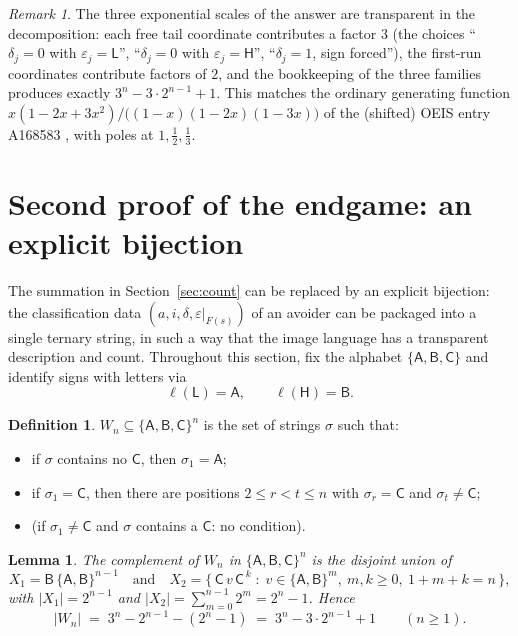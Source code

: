 \documentclass[11pt]{article}
\newtheorem{lemma}[theorem]{Lemma}
\theoremstyle{definition}
\newtheorem{definition}[theorem]{Definition}
\theoremstyle{remark}
\newtheorem{remark}[theorem]{Remark}
\newcommand{\sL}{\mathsf{L}}
\newcommand{\sH}{\mathsf{H}}
\newcommand{\sA}{\mathsf{A}}
\newcommand{\sB}{\mathsf{B}}
\newcommand{\sC}{\mathsf{C}}
\newcommand{\Wn}{W_n}
\begin{document}
\begin{remark}\label{rem:structure}
The three exponential scales of the answer are transparent in the
decomposition: each free tail coordinate contributes a factor $3$ (the
choices ``$\delta_j=0$ with $\varepsilon_j=\sL$'', ``$\delta_j=0$ with
$\varepsilon_j=\sH$'', ``$\delta_j=1$, sign forced''), the first-run
coordinates contribute factors of $2$, and the bookkeeping of the three
families produces exactly $3^n-3\cdot2^{n-1}+1$. This matches the ordinary
generating function
$x(1-2x+3x^2)/\bigl((1-x)(1-2x)(1-3x)\bigr)$
of the (shifted) OEIS entry A168583 \cite{OEIS}, with poles at
$1,\tfrac12,\tfrac13$.
\end{remark}

\section{Second proof of the endgame: an explicit bijection}\label{sec:bijection}

The summation in Section~\ref{sec:count} can be replaced by an explicit
bijection: the classification data $(a,i,\delta,\varepsilon|_{F(s)})$ of an
avoider can be packaged into a single ternary string, in such a way that
the image language has a transparent description and count. Throughout this
section, fix the alphabet $\{\sA,\sB,\sC\}$ and identify signs with letters
via
\[
 \ell(\sL)=\sA,\qquad \ell(\sH)=\sB .
\]

\begin{definition}\label{def:Wn}
$\Wn\subseteq\{\sA,\sB,\sC\}^n$ is the set of strings $\sigma$ such that:
\begin{itemize}
\item if $\sigma$ contains no $\sC$, then $\sigma_1=\sA$;
\item if $\sigma_1=\sC$, then there are positions $2\le r<t\le n$ with
  $\sigma_r=\sC$ and $\sigma_t\neq\sC$;
\item (if $\sigma_1\neq\sC$ and $\sigma$ contains a $\sC$: no condition).
\end{itemize}
\end{definition}

\begin{lemma}\label{lem:Wcount}
The complement of $\Wn$ in $\{\sA,\sB,\sC\}^n$ is the disjoint union of
\[
 X_1=\sB\,\{\sA,\sB\}^{n-1}
 \quad\text{and}\quad
 X_2=\{\,\sC\,v\,\sC^{\,k}\;:\; v\in\{\sA,\sB\}^{m},\ m,k\ge0,\
 1+m+k=n \,\},
\]
with $|X_1|=2^{n-1}$ and $|X_2|=\sum_{m=0}^{n-1}2^m=2^n-1$. Hence
\[
  |\Wn| \;=\; 3^n-2^{n-1}-(2^n-1) \;=\; 3^n-3\cdot2^{n-1}+1
  \qquad(n\ge1).
\]
\end{lemma}
\end{document}
